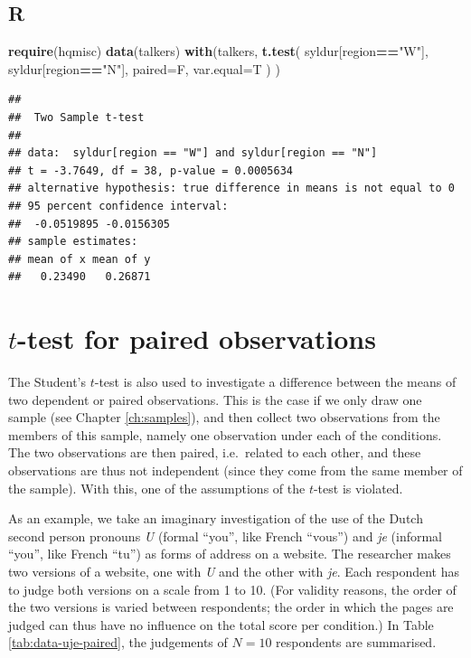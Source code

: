 \documentclass[
]{book}
\newenvironment{Shaded}{\begin{snugshade}}{\end{snugshade}}
\newcommand{\DataTypeTok}[1]{\textcolor[rgb]{0.13,0.29,0.53}{#1}}
\newcommand{\KeywordTok}[1]{\textcolor[rgb]{0.13,0.29,0.53}{\textbf{#1}}}
\newcommand{\NormalTok}[1]{#1}
\newcommand{\OperatorTok}[1]{\textcolor[rgb]{0.81,0.36,0.00}{\textbf{#1}}}
\newcommand{\StringTok}[1]{\textcolor[rgb]{0.31,0.60,0.02}{#1}}
\begin{document}
\hypertarget{sec:R-ttest-unpaired}{%
\subsection{R}\label{sec:R-ttest-unpaired}}

\begin{Shaded}
\begin{Highlighting}[]
\KeywordTok{require}\NormalTok{(hqmisc)}
\KeywordTok{data}\NormalTok{(talkers)}
\KeywordTok{with}\NormalTok{(talkers, }\KeywordTok{t.test}\NormalTok{( syldur[region}\OperatorTok{==}\StringTok{"W"}\NormalTok{], syldur[region}\OperatorTok{==}\StringTok{"N"}\NormalTok{], }
            \DataTypeTok{paired=}\NormalTok{F, }\DataTypeTok{var.equal=}\NormalTok{T ) )}
\end{Highlighting}
\end{Shaded}

\begin{verbatim}
## 
##  Two Sample t-test
## 
## data:  syldur[region == "W"] and syldur[region == "N"]
## t = -3.7649, df = 38, p-value = 0.0005634
## alternative hypothesis: true difference in means is not equal to 0
## 95 percent confidence interval:
##  -0.0519895 -0.0156305
## sample estimates:
## mean of x mean of y 
##   0.23490   0.26871
\end{verbatim}

\hypertarget{sec:ttest-paired}{%
\section{\texorpdfstring{\(t\)-test for paired observations}{t-test for paired observations}}\label{sec:ttest-paired}}

The Student's \(t\)-test is also used to investigate a difference between the
means of two dependent or paired observations. This is the case if we only draw
one sample (see Chapter
\ref{ch:samples}), and then collect two observations from the members of this
sample,
namely one observation under each of the conditions. The two
observations are then paired, i.e.~related to each other,
and these observations are thus not independent (since they come
from the same member of the sample). With this, one of the assumptions of
the \(t\)-test is violated.

As an example, we take an imaginary investigation of the use of the
Dutch second person pronouns \emph{U} (formal ``you'', like French ``vous'') and \emph{je} (informal ``you'', like French ``tu'') as forms of address on a website. The researcher makes two versions
of a website, one with \emph{U} and the other with \emph{je}. Each
respondent has to judge both versions on a scale from 1 to 10. (For validity
reasons, the order of the two versions is varied between respondents;
the order in which the pages are judged can thus
have no influence on the total score per condition.) In Table
\ref{tab:data-uje-paired}, the judgements of \(N=10\)
respondents are summarised.
\end{document}
